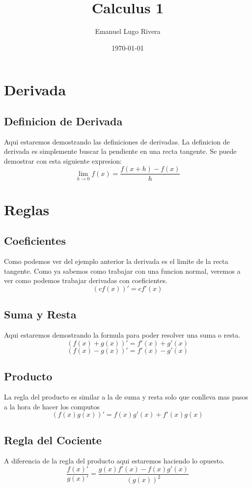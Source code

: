 \documentclass[a4paper,12pt]{article}
\title{Calculus 1}
\author{Emanuel Lugo Rivera}
\date{\today}
\begin{document}
\begin{titlepage}
    \maketitle
\end{titlepage}


\section{Derivada}
\subsection{Definicion de Derivada}
Aqui estaremos demostrando las definiciones de derivadas. La definicion de derivada es simplemente buscar la pendiente en una recta tangente.
Se puede demostrar con esta siguiente expresion:
$$\lim_{h \to 0} f(x) = \frac{f(x+h)-f(x)}{h}$$

\section{Reglas}
\subsection{Coeficientes}
Como podemos ver del ejemplo anterior la derivada es el limite de la recta tangente.
Como ya sabemos como trabajar con una funcion normal, veremos a ver como podemos trabajar derivadas con coeficientes.
$$(cf(x))'= cf'(x)$$

\subsection{Suma y Resta}
Aqui estaremos demostrando la formula para poder resolver una suma o resta.
$$(f(x)+g(x))' = f'(x)+g'(x)$$
$$(f(x)-g(x))'= f'(x)-g'(x)$$
\subsection{Producto}
La regla del producto es similar a la de suma y resta solo que conlleva mas pasos a la hora de hacer los computos
$$(f(x)g(x))'=f(x)g'(x)+f'(x)g(x)$$
\subsection{Regla del Cociente}
A diferencia de la regla del producto aqui estaremos haciendo lo opuesto.
$$\frac{f(x)'}{g(x)'} = \frac{g(x)f'(x)-f(x)g'(x)}{(g(x))^2}$$
\end{document}
